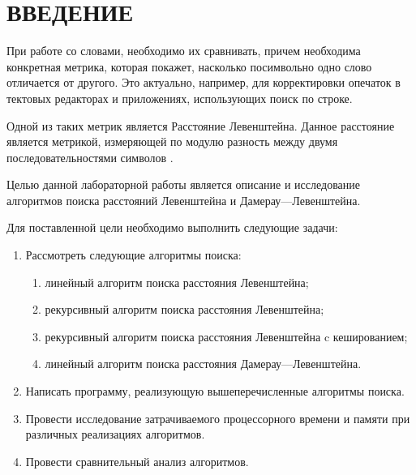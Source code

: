 \chapter*{\hfill{\centering  ВВЕДЕНИЕ}\hfill}


При работе со словами, необходимо их сравнивать, причем необходима конкретная метрика, которая покажет, насколько посимвольно одно слово отличается от другого. Это актуально, например, для корректировки опечаток в тектовых редакторах и приложениях, использующих поиск по строке.

Одной из таких метрик является Расстояние Левенштейна.
Данное расстояние является метрикой, измеряющей по модулю разность между двумя последовательностями символов \cite{levenshtein}.

\label{sec:targets}
Целью данной лабораторной работы является описание и исследование алгоритмов поиска расстояний Левенштейна и Дамерау---Левенштейна.

Для поставленной цели необходимо выполнить следующие задачи:
\begin{enumerate}
	\item Рассмотреть следующие алгоритмы поиска:
	\begin{enumerate}
		\item линейный алгоритм поиска расстояния Левенштейна;
		\item рекурсивный алгоритм поиска расстояния Левенштейна;
		\item рекурсивный алгоритм поиска расстояния Левенштейна c кешированием;
		\item линейный алгоритм поиска расстояния Дамерау---Левенштейна.
	\end{enumerate}
	\item Написать программу, реализующую вышеперечисленные алгоритмы поиска.
	\item Провести исследование затрачиваемого процессорного времени и памяти при различных реализациях алгоритмов.
	\item Провести сравнительный анализ алгоритмов.
\end{enumerate}